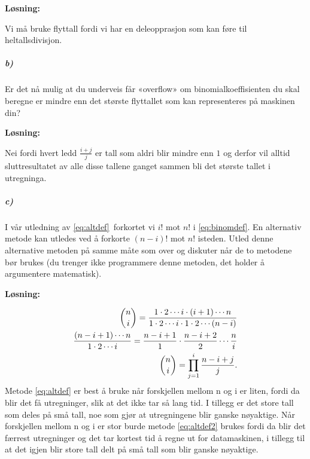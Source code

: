 \documentclass[11pt,norsk]{article}
\begin{document}
				\begin{flushleft}
\textbf{Løsning:}
				\end{flushleft}
				\begin{flushleft}
Vi må bruke flyttall fordi vi har en deleopprasjon som kan føre til heltallsdivisjon.
				\end{flushleft}

			\subparagraph{b)}
				\begin{flushleft}
Er det nå mulig at du underveis får «overflow» om binomialkoeffisienten du skal beregne er mindre enn det største flyttallet som kan representeres på maskinen din?
				\end{flushleft}
				\begin{flushleft}
\textbf{Løsning:}
				\end{flushleft}
				\begin{flushleft}
Nei fordi hvert ledd $\frac{i + j}{j}$ er tall som aldri blir mindre enn $1$ og derfor vil alltid sluttresultatet av alle disse tallene ganget sammen bli det største tallet i utregninga.
				\end{flushleft}
			\subparagraph{c)}
				\begin{flushleft}
I vår utledning av \eqref{eq:altdef} forkortet vi $i!$ mot $n!$ i
\eqref{eq:binomdef}. En alternativ metode kan utledes ved å forkorte 
$(n-i)!$ mot $n!$ isteden. Utled denne alternative metoden på samme måte som over og diskuter når de to metodene bør brukes (du trenger ikke programmere denne metoden, det holder å argumentere matematisk).
				\end{flushleft}
				\begin{flushleft}
\textbf{Løsning:}
				\end{flushleft}
				\begin{flushleft}
					\begin{align}{\label{eq:altdef2}}
\binom{n}{i} = \frac{1 \cdot 2 \cdots i \cdot (i + 1) \cdots n}{1 \cdot 2 \cdots i \cdot 1 \cdot 2 \cdots (n - i)} \nonumber \\
\frac{(n-i+1) \cdots n}{1 \cdot 2 \cdots i} = \frac{n - i + 1}{1} \cdot \frac{n - i + 2}{2} \cdots \frac{n}{i} \nonumber \\
\binom{n}{i}=\prod_{j = 1}^{i} \frac{n - i + j}{j}.
					\end{align}
Metode \eqref{eq:altdef} er best å bruke når forskjellen mellom n og i er liten, fordi da blir det få utregninger, slik at det ikke tar så lang tid. I tillegg er det store tall som deles på små tall, noe som gjør at utregningene blir ganske nøyaktige. Når forskjellen mellom n og i er stor burde metode \eqref{eq:altdef2} brukes fordi da blir det færrest utregninger og det tar kortest tid å regne ut for datamaskinen, i tillegg til at det igjen blir store tall delt på små tall som blir ganske nøyaktige.
				\end{flushleft}
\end{document}
